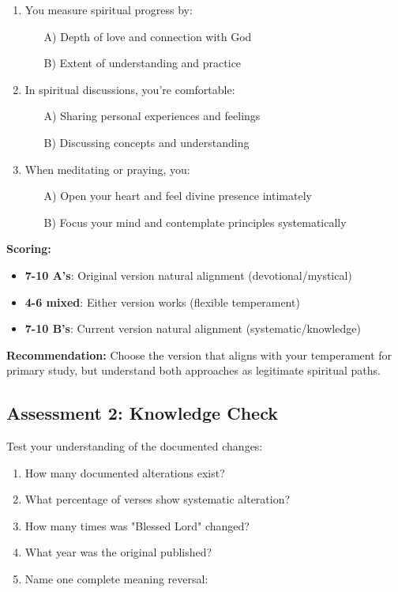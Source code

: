 \documentclass[11pt,twoside]{book}
\begin{document}
\begin{enumerate}
\item You measure spiritual progress by:
\begin{itemize}
\item[A)] Depth of love and connection with God
\item[B)] Extent of understanding and practice
\end{itemize}

\item In spiritual discussions, you're comfortable:
\begin{itemize}
\item[A)] Sharing personal experiences and feelings
\item[B)] Discussing concepts and understanding
\end{itemize}

\item When meditating or praying, you:
\begin{itemize}
\item[A)] Open your heart and feel divine presence intimately
\item[B)] Focus your mind and contemplate principles systematically
\end{itemize}
\end{enumerate}

\textbf{Scoring:}
\begin{itemize}
\item \textbf{7-10 A's}: Original version natural alignment (devotional/mystical)
\item \textbf{4-6 mixed}: Either version works (flexible temperament)
\item \textbf{7-10 B's}: Current version natural alignment (systematic/knowledge)
\end{itemize}

\textbf{Recommendation:}
Choose the version that aligns with your temperament for primary study, but understand both approaches as legitimate spiritual paths.

\subsection*{Assessment 2: Knowledge Check}
\label{sec:orgknowledge}

Test your understanding of the documented changes:

\begin{enumerate}
\item How many documented alterations exist? \underline{\hspace{3cm}}
\item What percentage of verses show systematic alteration? \underline{\hspace{3cm}}
\item How many times was "Blessed Lord" changed? \underline{\hspace{3cm}}
\item What year was the original published? \underline{\hspace{3cm}}
\item Name one complete meaning reversal: \underline{\hspace{5cm}}
\end{enumerate}
\end{document}
